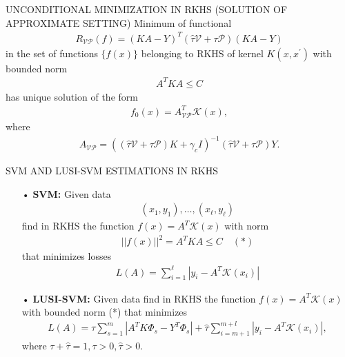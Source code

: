 \documentclass[11pt]{beamer}
\begin{document}
\begin{frame}{UNCONDITIONAL MINIMIZATION IN RKHS (SOLUTION OF APPROXIMATE SETTING)}
Minimum of functional
\begin{align*}
R_{\mathcal{VP}}(f) = (KA - Y)^{T}(\hat{\tau}\mathcal{V} + \tau\mathcal{P})(KA - Y)
\end{align*}
in the set of functions $\{f(x)\}$ belonging to RKHS of kernel $K(x,x^{\prime})$ with bounded norm
\begin{align*}
A^{T}KA \leq C
\end{align*}
has unique solution of the form
\begin{align*}
f_{0}(x) = A_{\mathcal{VP}}^{T}\mathcal{K}(x),
\end{align*}
where
\begin{align*}
A_{\mathcal{VP}} = ((\hat{\tau}\mathcal{V} + \tau\mathcal{P})K + \gamma_{c}I)^{-1}(\hat{\tau}\mathcal{V} + \tau\mathcal{P})Y.
\end{align*}
\end{frame}

\begin{frame}{SVM AND LUSI-SVM ESTIMATIONS IN RKHS}
\begin{enumerate}
\item[•] \textbf{SVM:} Given data
\begin{align*}
(x_{1}, y_{1}), \ldots, (x_{\ell}, y_{\ell})
\end{align*}
find in RKHS the function $f(x) = A^{T}\mathcal{K}(x)$ with norm
\begin{align*}
||f(x)||^{2} = A^{T}KA \leq C \quad (*)
\end{align*}
that minimizes losses
\begin{align*}
L(A) = \sum_{i=1}^{\ell}|y_{i} - A^{T}\mathcal{K}(x_{i})|
\end{align*}
\item[•] \textbf{LUSI-SVM:} Given data find in RKHS the function $f(x) = A^{T}\mathcal{K}(x)$ with bounded norm (*) that minimizes
\begin{align*}
L(A) = \tau\sum_{s=1}^{m}|A^{T}K\Phi_{s} - Y^{T}\Phi_{s}| + \hat{\tau}\sum_{i=m+1}^{m+l} |y_{i} - A^{T}\mathcal{K}(x_{i})|,
\end{align*}
where $\tau + \hat{\tau} = 1, \tau > 0, \hat{\tau} > 0$.
\end{enumerate}
\end{frame}
\end{document}
